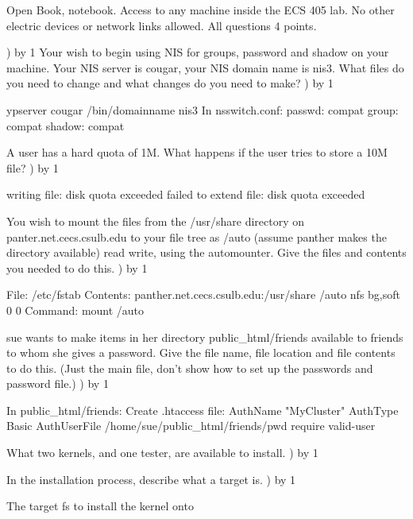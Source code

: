 
\parindent=0in
\nopagenumbers
\newcount\quesno
{}
\def\ques{\number\quesno) \advance\quesno by 1}
\def\aspace{\vskip 1.5in}

Open Book, notebook.
Access to any machine inside the ECS 405 lab.
No other electric devices or network links allowed.
All questions 4 points.

\ques
Your wish to begin using NIS for groups, password and shadow on your machine.
Your NIS server is {\ltt{}cougar}, your NIS domain name is {\ltt{}nis3}.
What files do you need to change and what changes do you need to make?
\vskip 1.8in
\ques

ypserver cougar
/bin/domainname nis3
In nsswitch.conf:
passwd: compat
group: compat 
shadow: compat

A user has a hard quota of 1M.
What happens if the user tries to store a 10M file?
\vskip 0.8in
\ques

writing file: disk quota exceeded
failed to extend file: disk quota exceeded

You wish to mount the files from the
{\ltt{}/usr/share} directory on {\ltt{}panter.net.cecs.csulb.edu}
to your file tree as {\ltt{}/auto} (assume panther makes the directory available) read write,
using the automounter.
Give the files and contents you needed to do this.
\vskip 1.8in
\ques

File:
/etc/fstab
Contents:
panther.net.cecs.csulb.edu:/usr/share /auto nfs
bg,soft 0 0
Command:
mount /auto

{\ltt{}sue} wants to make items in her directory
{\ltt{}public_html/friends} available to friends to whom she gives a password.
Give the file name, file location and file contents to do this.
(Just the main file, don't show how to set up the passwords and password file.)
\vskip 2.2in
\vfill\eject
\ques

In public_html/friends:
Create .htaccess file:
AuthName "MyCluster"
AuthType Basic
AuthUserFile /home/sue/public_html/friends/pwd
require valid-user

What two kernels, and one tester, are available to install.
\vskip 0.8in
\ques



In the installation process, describe what a target is.
\vskip 1.0in
\ques

The target fs to install the kernel onto

